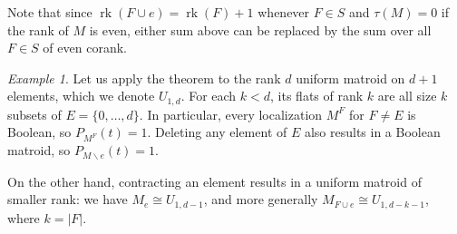 \documentclass[12pt,reqno]{amsart}
\theoremstyle{definition}
\theoremstyle{remark}
\newtheorem{example}[theorem]{Example}
\newcommand{\ssm}{\smallsetminus}
\newcommand{\rk}{\operatorname{rk}}
\renewcommand{\(}{\left(}
\renewcommand{\)}{\right)}
\newcommand{\<}{\left<}
\renewcommand{\>}{\right>}
\begin{document}
Note that since $\rk(F\cup e)= \rk(F)+1$ whenever $F \in S$ and $\tau(M) =0$ if the rank of $M$ is even, either sum above can be replaced by the sum over all $F \in S$ of even corank.

\begin{example}
Let us apply the theorem to the rank $d$ uniform matroid on $d+1$ elements, which we  denote $U_{1,d}$.  For each $k < d$, its flats of rank $k$ are all size $k$ subsets of $E = \{0,\dots, d\}$.
In particular, every localization $M^F$ for $F \ne E$ is Boolean, so $P_{M^F}(t) = 1$.  Deleting any element of $E$ also results in a Boolean matroid, so $P_{M\ssm e}(t)=1$.  

On the other hand, contracting an element results in a uniform matroid of smaller rank: we have 
$M_e \cong U_{1,d-1}$, and more generally 
$M_{F\cup e} \cong U_{1,d-k-1}$, where $k = |F|$.


\end{example}
\end{document}
